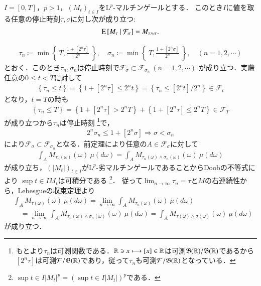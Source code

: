 	\begin{itembox}[l]{}
		\begin{thm}[任意抽出定理(2)]
			$I = [0,T]$，$p > 1$，$(M_t)_{t \in I}$を$\mathrm{L}^p$-マルチンゲールとする．
			このとき$I$に値を取る任意の停止時刻$\tau,\sigma$に対し次が成り立つ:
			\begin{align}
				\operatorname{E} \left[ M_\tau \ \middle|\ \mathcal{F}_\sigma \right] = M_{\tau \wedge \sigma}.
			\end{align}
			\label{thm:optional_sampling_theorem_2}
		\end{thm}
	\end{itembox}
	
	\begin{prf}
		\begin{align}
			\tau_n \coloneqq \min{}{\left\{\ T, \frac{1+[2^n \tau]}{2^n}\ \right\}},
			\quad \sigma_n \coloneqq \min{}{\left\{\ T, \frac{1+[2^n \sigma]}{2^n}\ \right\}},
			\quad (n=1,2,\cdots)
		\end{align}
		とおく．このとき$\tau_n,\sigma_n$は停止時刻で$\mathcal{F}_\sigma \subset \mathcal{F}_{\sigma_n}\ (n=1,2,\cdots)$
		が成り立つ．実際任意の$0 \leq t < T$に対して
		\begin{align}
			\left\{ \tau_n \leq t \right\} = \left\{ 1 + [2^n \tau] \leq 2^n t \right\} = \left\{ \tau_n \leq [2^n t]/2^n \right\} \in \mathcal{F}_t
		\end{align}
		となり，$t = T$の時も
		\begin{align}
			\left\{ \tau_n \leq T \right\} = \left\{ 1 + [2^n \tau] > 2^n T \right\} + \left\{ 1 + [2^n \tau] \leq 2^n T \right\} \in \mathcal{F}_T
		\end{align}
		が成り立つから$\tau_n$は停止時刻
		\footnote{
			もとより$\tau_n$は可測関数である．$\mathbb{R} \ni x \longmapsto [x] \in \mathbb{R}$は可測$\mathfrak{B}(\mathbb{R})/\mathfrak{B}(\mathbb{R})$であるから
			$[2^n \tau]$は可測$\mathcal{F}/\mathfrak{B}(\mathbb{R})$であり，従って$\tau_n$も可測$\mathcal{F}/\mathfrak{B}(\mathbb{R})$となっている．
		}で，
		\begin{align}
			2^n \sigma_n \leq 1 + [2^n \sigma] 
			\Rightarrow \sigma < \sigma_n
		\end{align}
		により$\mathcal{F}_\sigma \subset \mathcal{F}_{\sigma_n}$となる．前定理により任意の$A \in \mathcal{F}_\sigma$に対して
		\begin{align}
			\int_A M_{\tau_n(\omega)}(\omega)\ \mu(d\omega) = \int_A M_{\tau_n(\omega)\wedge \sigma_n(\omega)}(\omega)\ \mu(d\omega) 
		\end{align}
		が成り立ち，$(|M_t|)_{t \in I}$が$\mathrm{L}^p$-劣マルチンゲールであることからDoobの不等式により
		$\sup{t \in I}{M_t}$は可積分である
		\footnote{
			$\sup{t \in I}{|M_t|^p} = \left( \sup{t \in I}{|M_t|} \right)^p$である．
		}．
		従って$\lim_{n \to \infty} \tau_n = \tau$と$M$の右連続性から，Lebesgueの収束定理より
		\begin{align}
			&\int_A M_{\tau(\omega)}(\omega)\ \mu(d\omega) = \lim_{n \to \infty} \int_A M_{\tau_n(\omega)}(\omega)\ \mu(d\omega) \\
			&\quad = \lim_{n \to \infty} \int_A M_{\tau_n(\omega)\wedge \sigma_n(\omega)}(\omega)\ \mu(d\omega)
			= \int_A M_{\tau(\omega)\wedge \sigma(\omega)}(\omega)\ \mu(d\omega)
		\end{align}
		が成り立つ．
		\QED
	\end{prf}
	